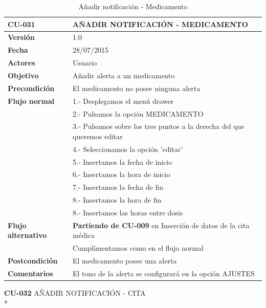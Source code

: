 \documentclass[../pfc.tex]{subfiles}
\begin{document}
	\begin{table}[H]
		\centering
		\begin{tabular}[t]{|p{3cm}|p{9.5cm}|}
			\hline \textbf{CU-031} & \textbf{AÑADIR NOTIFICACIÓN - MEDICAMENTO} \\*
			\hline\hline \textbf{Versión} & 1.0 \\*
			\hline\hline \textbf{Fecha} & 28/07/2015 \\*
			\hline\textbf{Actores} 	& Usuario\\*
			\hline \textbf{Objetivo} & Añadir alerta a un medicamento\\* 			
			\hline \textbf{Precondición} & El medicamento no posee ninguna alerta\\* 
			\hline \textbf{Flujo normal} & 1.- Desplegamos el menú drawer \\* 
			& 2.- Pulsamos la opción MEDICAMENTO\\*	
			& 3.- Pulsamos sobre los tres puntos a la derecha del que queremos editar\\*	
			& 4.- Seleccionamos la opción 'editar'\\*	
			& 5.- Insertamos la fecha de inicio\\*
			& 6.- Insertamos la hora de inicio\\*
			& 7.- Insertamos la fecha de fin\\*
			& 8.- Insertamos la hora de fin\\*
			& 8.- Insertamos las horas entre dosis\\*
			\hline \textbf{Flujo alternativo} & \textbf{Partiendo de CU-009} en Inserción de datos de la cita médica\\*  
			& Cumplimentamos como en el flujo normal\\*
			\hline \textbf{Postcondición} & El medicamento posee una alerta\\* 
			\hline \textbf{Comentarios}   & El tono de la alerta se configurará en la opción AJUSTES\\*
			\hline
		\end{tabular}
		\caption{Añadir notificación - Medicamento}
		\label{tabla:caso031}
	\end{table}	
	
	\clearpage	

	\textbf{CU-032}	AÑADIR NOTIFICACIÓN - CITA\\*
	
\end{document}
